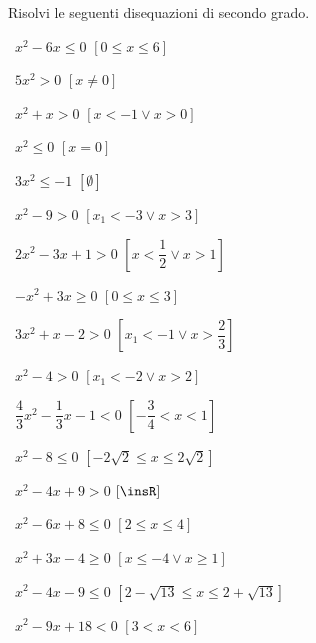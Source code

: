 \begin{esercizio}[\Ast]
 \label{ese:4.1}
Risolvi le seguenti disequazioni di secondo grado.
\vspace{\dy}
\begin{multicols}{2}
 \begin{enumeratea}
 \item~\(x^2-6x\le 0\) \hfill \(\left[0\le x\le 6\right]\)
 \item~\(5x^2>0\) \hfill \(\left[x\neq 0\right]\)
 \item~\(x^2+x>0\) \hfill \(\left[x<-1\vee x>0\right]\)
 \item~\(x^2\le 0\) \hfill \(\left[x=0\right]\)
 \item~\(3x^2\le -1\) \hfill \(\left[\emptyset \right]\)
 \item~\(x^2-9>0\) \hfill \(\left[x_1<-3\vee x>3\right]\)
 \item~\(2x^2-3x+1>0\) \hfill \(\left[x<\dfrac 1 2\vee x>1\right]\)
 \item~\(-x^2+3x\ge 0\) \hfill \(\left[0\le x\le 3\right]\)
 \item~\(3x^2+x-2>0\) \hfill \(\left[x_1<-1\vee x>\dfrac 2 3\right]\)
 \item~\(x^2-4>0\) \hfill \(\left[x_1<-2\vee x>2\right]\)
 \item~\(\dfrac 4 3x^2-\dfrac 1 3x-1<0\) \hfill \(\left[-\dfrac 3 
4<x<1\right]\)
 \item~\(x^2-8\le 0\) \hfill \(\left[-2\sqrt 2\le x\le 2\sqrt 2\right]\)
 \item~\(x^2-4x+9>0\) \hfill \(\left[\insR\right]\)
 \item~\(x^2-6x+8\le 0\) \hfill \(\left[2\le x\le 4\right]\)
 \item~\(x^2+3x-4\ge 0\) \hfill \(\left[x\le -4\vee x\ge 1\right]\)
 \item~\(x^2-4x-9\le 0\) \hfill \(\left[2-\sqrt{13}\le x\le 
2+\sqrt{13}\right]\)
 \item~\(x^2-9x+18<0\) \hfill \(\left[3<x<6\right]\)
 \end{enumeratea}
 \end{multicols}
\end{esercizio}

